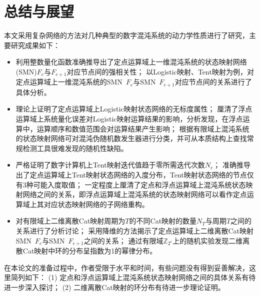 \chapter{总结与展望}

本文采用复杂网络的方法对几种典型的数字混沌系统的动力学性质进行了研究，主要研究成果如下：
\begin{itemize}

  \item

  利用整数量化函数准确推导出了定点运算域上一维混沌系统的状态映射网络(SMN)$F_e$与$F_{e+1}$对应节点间的强相关性；
  以Logistic映射、Tent映射为例，对定点运算域上一维混沌系统的SMN\ $F_e$与SMN\ $F_{e+1}$对应节点间的关系进行了具体分析。

  \item

  理论上证明了定点运算域上Logistic映射状态网络的无标度属性；
  厘清了浮点运算域上系统量化误差对Logistic映射运算结果的影响，分析发现，在浮点运算中，运算顺序和数值范围会对运算结果产生影响；
  根据有限域上混沌系统的状态映射网络可对混沌伪随机数发生器进行分类，并可从本质结构上查找常规检测工具很难发现的随机性缺陷。

  \item

  严格证明了数字计算机上Tent映射迭代值趋于零所需迭代次数$N_r$；
  准确推导出了定点运算域上Tent映射状态网络的入度分布，Tent映射状态网络的节点仅有3种可能入度取值；
  一定程度上厘清了定点和浮点运算域上混沌系统状态映射网络之间的关系，即浮点运算域上混沌系统的状态映射网络可以看作定点运算域上其对应状态映射网络的子网络重构。

  \item

  对有限域上二维离散Cat映射周期为$T$的不同Cat映射的数量$N_T$与周期$T$之间的关系进行了分析讨论；
  采用降维的方法揭示了定点运算域上二维离散Cat映射SMN\ $F_e$与SMN\ $F_{e+1}$之间的关系；
  通过有限域$\mathbb{Z}_{2^e}$上的随机实验发现二维离散Cat映射中环的分布呈指数为1的幂律分布。

\end{itemize}

在本论文的准备过程中，作者受限于水平和时间，有些问题没有得到妥善解决，这里简列如下：
(1) 定点和浮点运算域上混沌系统状态映射网络之间的具体关系有待进一步深入探讨；
(2) 二维离散Cat映射的环分布有待进一步理论证明。


